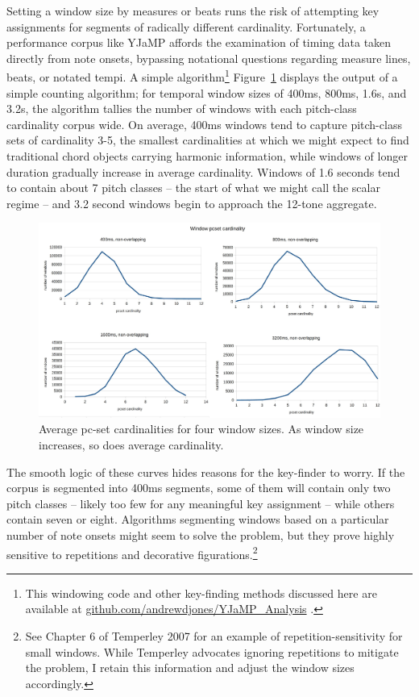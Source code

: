 Setting a window size by measures or beats runs the risk of attempting key assignments for segments of radically different cardinality.  Fortunately, a performance corpus like YJaMP affords the examination of timing data taken directly from note onsets, bypassing notational questions regarding measure lines, beats, or notated tempi.  A simple algorithm\footnote{This windowing code and other key-finding methods discussed here are available at \href{github.com/andrewdjones/YJaMP_Analysis}{github.com/andrewdjones/YJaMP_Analysis} .}  Figure~\ref{cardinalities} displays the output of a simple counting algorithm; for temporal window sizes of 400ms, 800ms, 1.6s, and 3.2s, the algorithm tallies the number of windows with each pitch-class cardinality corpus wide.  On average, 400ms windows tend to capture pitch-class sets of cardinality 3-5, the smallest cardinalities at which we might expect to find traditional chord objects carrying harmonic information, while windows of longer duration gradually increase in average cardinality.  Windows of 1.6 seconds tend to contain about 7 pitch classes -- the start of what we might call the scalar regime -- and 3.2 second windows begin to approach the 12-tone aggregate.

\begin{landscape}
\begin{figure}
	\centering
	\includegraphics[width=8in]{cardinalities.jpg}
	\caption{Average pc-set cardinalities for four window sizes.  As window size increases, so does average cardinality.}
	\label{cardinalities}
\end{figure}
\end{landscape}

The smooth logic of these curves hides reasons for the key-finder to worry.  If the corpus is segmented into 400ms segments, some of them will contain only two pitch classes -- likely too few for any meaningful key assignment -- while others contain seven or eight.  Algorithms segmenting windows based on a particular number of note onsets might seem to solve the problem, but they prove highly sensitive to repetitions and decorative figurations.\footnote{See Chapter 6 of Temperley 2007 for an example of repetition-sensitivity for small windows.  While Temperley advocates ignoring repetitions to mitigate the problem, I retain this information and adjust the window sizes accordingly.}

